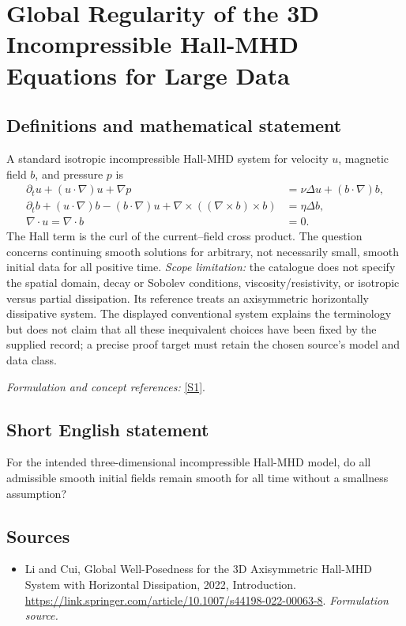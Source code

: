 \documentclass[11pt]{article}
\begin{document}
\section*{\texorpdfstring{Global Regularity of the 3D Incompressible Hall-MHD Equations for Large Data}{Global Regularity of the 3D Incompressible Hall-MHD Equations for Large Data}}\label{30006900}
\subsection{Definitions and mathematical statement}
A standard isotropic incompressible Hall-MHD system for velocity $u$, magnetic field $b$, and pressure $p$ is
\[
 \begin{aligned}
 \partial_tu+(u\cdot\nabla)u+\nabla p&=\nu\Delta u+(b\cdot\nabla)b,\\
 \partial_tb+(u\cdot\nabla)b-(b\cdot\nabla)u
   +\nabla\times((\nabla\times b)\times b)&=\eta\Delta b,\\
 \nabla\cdot u=\nabla\cdot b&=0.
 \end{aligned}
\]
The Hall term is the curl of the current--field cross product. The question concerns continuing smooth solutions for arbitrary, not necessarily small, smooth initial data for all positive time. \emph{Scope limitation:} the catalogue does not specify the spatial domain, decay or Sobolev conditions, viscosity/resistivity, or isotropic versus partial dissipation. Its reference treats an axisymmetric horizontally dissipative system. The displayed conventional system explains the terminology but does not claim that all these inequivalent choices have been fixed by the supplied record; a precise proof target must retain the chosen source's model and data class.
\par\smallskip\textit{Formulation and concept references:} \href{https://link.springer.com/article/10.1007/s44198-022-00063-8}{[S1]}.

\subsection{Short English statement}
For the intended three-dimensional incompressible Hall-MHD model, do all admissible smooth initial fields remain smooth for all time without a smallness assumption?
\subsection{Sources}
\begin{itemize}
\item[S1]Li and Cui, Global Well-Posedness for the 3D Axisymmetric Hall-MHD System with Horizontal Dissipation, 2022, Introduction.
\url{https://link.springer.com/article/10.1007/s44198-022-00063-8}.
\textit{Formulation source.}
\end{itemize}
\end{document}
